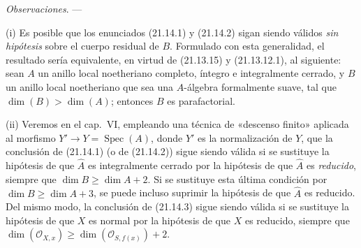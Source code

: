 \begin{env}[21.14.4]
\label{IV.21.14.4}
\emph{Observaciones}. ---

(i) Es posible que los enunciados (21.14.1) y (21.14.2) sigan siendo válidos \emph{sin
hipótesis} sobre el cuerpo residual de $B$. Formulado con esta generalidad, el resultado
sería equivalente, en virtud de (21.13.15) y (21.13.12.1), al siguiente: sean $A$ un
anillo local noetheriano completo, íntegro e integralmente cerrado, y $B$ un anillo local
noetheriano que sea una $A$-álgebra formalmente suave, tal que
$\dim(B)>\dim(A)$; entonces $B$ es parafactorial.

(ii) Veremos en el cap.~VI, empleando una técnica de «descenso finito»
aplicada al morfismo $Y'\to Y=\operatorname{Spec}(A)$, donde $Y'$ es la normalización de
$Y$, que la conclusión de (21.14.1) (o de (21.14.2)) sigue siendo válida si se sustituye
la hipótesis de que $\widehat A$ es integralmente cerrado por la hipótesis de que
$\widehat A$ es \emph{reducido}, siempre que $\dim B\geq\dim A+2$. Si se sustituye esta
última condición por $\dim B\geq\dim A+3$, se puede incluso suprimir la hipótesis de que
$\widehat A$ es reducido. Del mismo modo, la conclusión de (21.14.3) sigue siendo válida si se
sustituye la hipótesis de que $X$ es normal por la hipótesis de que $X$ es reducido, siempre
que $\dim(\mathcal O_{X,x})\geq\dim(\mathcal O_{S,f(x)})+2$.


\end{env}
